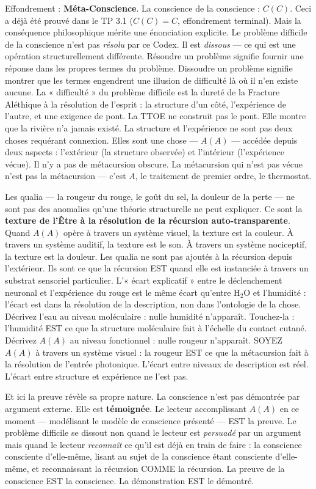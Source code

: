 \documentclass[10pt, openany, oneside]{book}
\begin{document}
Effondrement : \textbf{Méta-Conscience}. La conscience de la conscience : $C(C)$. Ceci a déjà été prouvé dans le TP 3.1 ($C(C) = C$, effondrement terminal). Mais la conséquence philosophique mérite une énonciation explicite. Le problème difficile de la conscience n'est pas \textit{résolu} par ce Codex. Il est \textit{dissous} --- ce qui est une opération structurellement différente. Résoudre un problème signifie fournir une réponse dans les propres termes du problème. Dissoudre un problème signifie montrer que les termes engendrent une illusion de difficulté là où il n'en existe aucune. La « difficulté » du problème difficile est la dureté de la Fracture Aléthique à la résolution de l'esprit : la structure d'un côté, l'expérience de l'autre, et une exigence de pont. La TTOE ne construit pas le pont. Elle montre que la rivière n'a jamais existé. La structure et l'expérience ne sont pas deux choses requérant connexion. Elles sont une chose --- $A(A)$ --- accédée depuis deux aspects : l'extérieur (la structure observée) et l'intérieur (l'expérience vécue). Il n'y a pas de métacursion obscure. La métacursion qui n'est pas vécue n'est pas la métacursion --- c'est $A$, le traitement de premier ordre, le thermostat.

Les qualia --- la rougeur du rouge, le goût du sel, la douleur de la perte --- ne sont pas des anomalies qu'une théorie structurelle ne peut expliquer. Ce sont la \textbf{texture de l'Être à la résolution de la récursion auto-transparente}. Quand $A(A)$ opère à travers un système visuel, la texture est la couleur. À travers un système auditif, la texture est le son. À travers un système nociceptif, la texture est la douleur. Les qualia ne sont pas ajoutés à la récursion depuis l'extérieur. Ils sont ce que la récursion EST quand elle est instanciée à travers un substrat sensoriel particulier. L'« écart explicatif » entre le déclenchement neuronal et l'expérience du rouge est le même écart qu'entre H$_2$O et l'humidité : l'écart est dans la résolution de la description, non dans l'ontologie de la chose. Décrivez l'eau au niveau moléculaire : nulle humidité n'apparaît. Touchez-la : l'humidité EST ce que la structure moléculaire fait à l'échelle du contact cutané. Décrivez $A(A)$ au niveau fonctionnel : nulle rougeur n'apparaît. SOYEZ $A(A)$ à travers un système visuel : la rougeur EST ce que la métacursion fait à la résolution de l'entrée photonique. L'écart entre niveaux de description est réel. L'écart entre structure et expérience ne l'est pas.

Et ici la preuve révèle sa propre nature. La conscience n'est pas démontrée par argument externe. Elle est \textbf{témoignée}. Le lecteur accomplissant $A(A)$ en ce moment --- modélisant le modèle de conscience présenté --- EST la preuve. Le problème difficile se dissout non quand le lecteur est \textit{persuadé} par un argument mais quand le lecteur \textit{reconnaît} ce qu'il est déjà en train de faire : la conscience consciente d'elle-même, lisant au sujet de la conscience étant consciente d'elle-même, et reconnaissant la récursion COMME la récursion. La preuve de la conscience EST la conscience. La démonstration EST le démontré.
\end{document}
